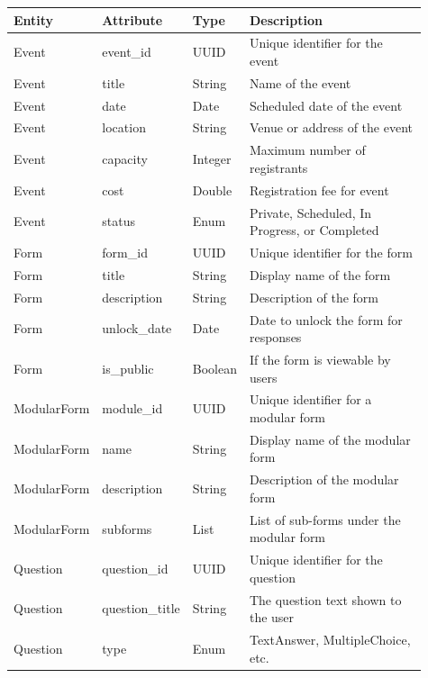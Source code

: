 \documentclass[12pt]{article}
\begin{document}
\begin{table}[H]
\footnotesize
\begin{tabular}{p{0.15\linewidth}p{0.15\linewidth}p{0.1\linewidth}p{0.51\linewidth}}
  \toprule
  \textbf{Entity} & \textbf{Attribute} & \textbf{Type} & \textbf{Description} \\
  \midrule
  Event      & event\_id       & UUID    & Unique identifier for the event \\
  Event      & title           & String  & Name of the event \\
  Event      & date            & Date    & Scheduled date of the event \\
  Event      & location        & String  & Venue or address of the event \\
  Event      & capacity        & Integer & Maximum number of registrants \\
  Event      & cost            & Double  & Registration fee for event\\
  Event      & status          & Enum    & Private, Scheduled, In Progress, or Completed \\
  \midrule
  Form       & form\_id        & UUID    & Unique identifier for the form \\
  Form       & title           & String  & Display name of the form \\
  Form       & description     & String  & Description of the form \\
  Form       & unlock\_date    & Date    & Date to unlock the form for responses \\
  Form       & is\_public      & Boolean & If the form is viewable by users \\
  \midrule
  ModularForm & module\_id      & UUID   & Unique identifier for a modular form \\
  ModularForm & name            & String & Display name of the modular form \\
  ModularForm & description     & String & Description of the modular form \\
  ModularForm & subforms        & List   & List of sub-forms under the modular form \\
  \midrule
  Question   & question\_id    & UUID    & Unique identifier for the question \\
  Question   & question\_title & String  & The question text shown to the user \\
  Question   & type            & Enum    & TextAnswer, MultipleChoice, etc. \\

\end{tabular}
\end{table}
\end{document}
